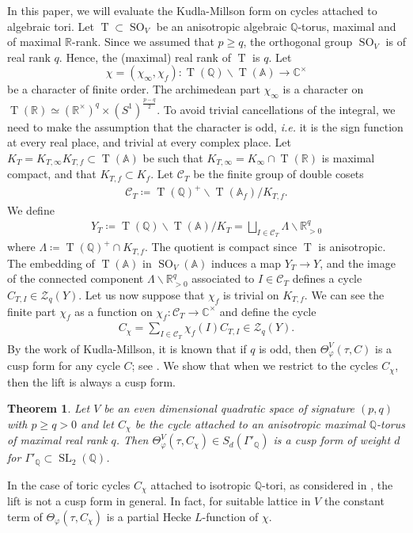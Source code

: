 \documentclass[11pt]{article} %
\newcommand{\8}{\infty}
\newcommand{\Tbf}{\operatorname{T}}
\newcommand{\SO}{\operatorname{SO}}
\newcommand{\SL}{\operatorname{SL}}
\newcommand{\R}{\mathbb{R}}
\newcommand{\A}{\mathbb{A}}
\newcommand{\Q}{\mathbb{Q}}
\newcommand{\C}{\mathbb{C}}
\newcommand{\Ccal}{\mathcal{C}}
\newcommand{\Zcal}{\mathcal{Z}}
\newcommand{\fin}{f}
\theoremstyle{mytheoremstyle}
\newtheorem{thm}{Theorem}[section]
\theoremstyle{remark}
\numberwithin{equation}{section}
\begin{document}
In this paper, we will evaluate the Kudla-Millson form on cycles attached to algebraic tori. Let $\Tbf \subset \SO_V$ be an anisotropic algebraic $\Q$-torus, maximal and of maximal $\R$-rank. Since we assumed that $p \geq q$, the orthogonal group $\SO_V$ is of real rank $q$. Hence, the (maximal) real rank of  $\Tbf$ is $q$. Let 
$$\chi = (\chi_\8,\chi_\fin) \colon \Tbf(\Q) \backslash \Tbf(\A) \longrightarrow \C^\times$$ be a character of finite order. The archimedean part $\chi_\8$ is a character on $\Tbf(\R)\simeq (\R^\times)^q \times (S^1)^{\frac{p-q}{2}}$. To avoid trivial cancellations of the integral, we need to make the assumption that the character is odd, {\em i.e.} it is the sign function at every real place, and trivial at every complex place. Let $K_T=K_{T,\8}K_{T,\fin} \subset \Tbf(\A)$ be such that $K_{T,\8} = K_\8 \cap \Tbf(\R)$ is maximal compact, and that $K_{T,\fin} \subset K_{\fin}$. Let $\Ccal_T$ be the finite group of double cosets
\begin{align}
    \Ccal_T\coloneqq\Tbf(\Q)^+\backslash \Tbf(\A_\fin)/K_{T,\fin}.
\end{align} We define
\begin{align}
    Y_T \coloneqq \Tbf(\Q)\backslash \Tbf(\A)/K_T=\bigsqcup_{I \in \Ccal_{T}} \Lambda \backslash \R_{>0}^q
\end{align}
where $\Lambda \coloneqq \Tbf(\Q)^+ \cap K_{T,\fin}$. The quotient is compact since $\Tbf$ is anisotropic. The embedding of $\Tbf(\A)$ in $\SO_V(\A)$ induces a map $Y_T \longrightarrow Y$, and the image of the connected component $\Lambda \backslash \R_{>0}^q$ associated to $I \in \Ccal_T$ defines a cycle $C_{T,I} \in \Zcal_q(Y)$.
Let us now suppose that $\chi_\fin$ is trivial on $K_{T,\fin}$. We can see the finite part $\chi_\fin$ as a function on $\chi_\fin \colon \Ccal_{T} \longrightarrow \C^\times$ and define the cycle
\begin{align}
    C_{\chi}=\sum_{I \in \Ccal_{T}} \chi_{\fin}(I)C_{T,I} \in \Zcal_q(Y).
\end{align}
By the work of Kudla-Millson, it is known that if $q$ is odd, then $\Theta^V_\varphi(\tau,C)$ is a cusp form for any cycle $C$; see \cite[Theorem.~2]{KMIHES}. We show that when we restrict to the cycles $C_\chi$, then the lift is always a cusp form.

\begin{thm} Let $V$ be an even dimensional quadratic space of signature $(p,q)$ with $p \geq q >0$ and let $C_\chi$ be the cycle attached to an anisotropic maximal $\Q$-torus of maximal real rank $q$. Then $\Theta^V_\varphi(\tau,C_\chi) \in S_d(\Gamma'_\Q)$ is a cusp form of weight $d$ for  $\Gamma'_\Q \subset \SL_2(\Q)$.
\end{thm}
\noindent  In the case of toric cycles $C_\chi$ attached to isotropic $\Q$-tori, as considered in \cite{rbrforum}, the lift is not a cusp form in general. In fact, for suitable lattice in $V$ the constant term of $\Theta_\varphi(\tau,C_\chi)$ is a partial Hecke $L$-function of $\chi$.
\end{document}
